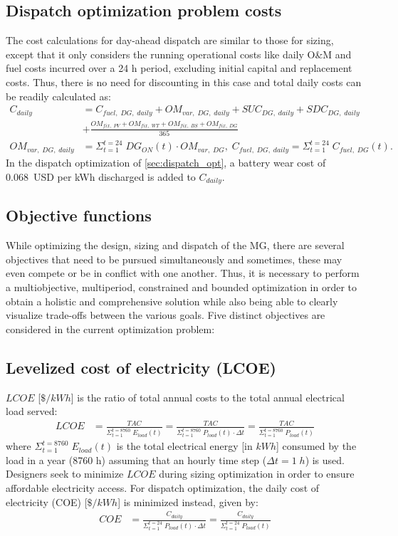 \documentclass[final,3p,times]{elsarticle}
\begin{document}
\subsection{Dispatch optimization problem costs}

The cost calculations for day-ahead dispatch are similar to those for sizing, except that it only considers the running operational costs like daily O\&M and fuel costs incurred over a 24 h period, excluding initial capital and replacement costs. Thus, there is no need for discounting in this case and total daily costs can be readily calculated as: 
\begin{align*}
    C_{daily} & = C_{fuel,\; DG,\; daily} + OM_{var, \; DG,\; daily} + SUC_{DG,\;daily} + SDC_{DG,\;daily} \\
    & + \frac{OM_{fix,\;PV} + OM_{fix,\;WT} + OM_{fix,\;BS} + OM_{fix,\;DG}}{365} \\
    OM_{var, \; DG,\; daily} & = \Sigma_{t=1}^{t=24} \; DG_{ON}(t) \cdot OM_{var, \; DG}, \; C_{fuel,\; DG,\; daily} = \Sigma_{t=1}^{t=24} \; C_{fuel,\; DG}(t). 
\end{align*}
In the dispatch optimization of \cref{sec:dispatch_opt}, a battery wear cost of 0.068~USD per kWh discharged is added to $C_{daily}$.

\subsection{Objective functions}

While optimizing the design, sizing and dispatch of the MG, there are several objectives that need to be pursued simultaneously and sometimes, these may even compete or be in conflict with one another. Thus, it is necessary to perform a multiobjective, multiperiod, constrained and bounded optimization in order to obtain a holistic and comprehensive solution while also being able to clearly visualize trade-offs between the various goals. Five distinct objectives are considered in the current optimization problem:

\subsection{Levelized cost of electricity (LCOE)}
$LCOE$ [$\$/kWh$] is the ratio of total annual costs to the total annual electrical load served:
\begin{align}
    LCOE & = \frac{TAC}{\Sigma_{t=1}^{t=8760} \; E_{load}(t)} = \frac{TAC}{\Sigma_{t=1}^{t=8760} \; P_{load}(t)\cdot \Delta t} = \frac{TAC}{\Sigma_{t=1}^{t=8760} \; P_{load}(t)}
\end{align}
where $\Sigma_{t=1}^{t=8760} \; E_{load}(t)$ is the total electrical energy [in $kWh$] consumed by the load in a year (8760 h) assuming that an hourly time step ($\Delta t = 1 \; h$) is used. Designers seek to minimize $LCOE$ during sizing optimization in order to ensure affordable electricity access. For dispatch optimization, the daily cost of electricity (COE) [$\$/kWh$] is minimized instead, given by:
\begin{align*}
    COE & = \frac{C_{daily}}{\Sigma_{t=1}^{t=24} \; P_{load} (t)\cdot \Delta t}  = \frac{C_{daily}}{\Sigma_{t=1}^{t=24} \; P_{load}(t)}
\end{align*}
\end{document}

